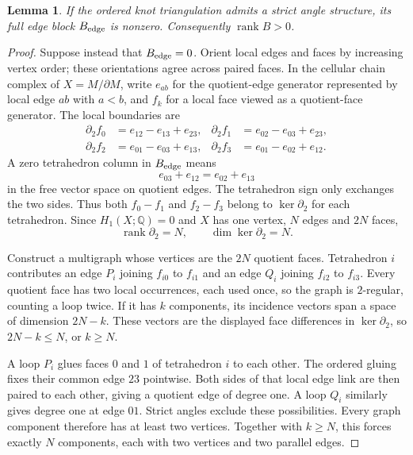 \documentclass[11pt]{article}
\newtheorem{lemma}[theorem]{Lemma}
\theoremstyle{definition}\newtheorem{definition}[theorem]{Definition}
\theoremstyle{remark}\newtheorem{remark}[theorem]{Remark}
\DeclareMathOperator{\rank}{rank}
\newcommand{\Q}{\mathbb Q}
\begin{document}
\begin{lemma}\label{lem:nozero}
If the ordered knot triangulation admits a strict angle structure,
its full edge block $B_{\rm edge}$ is nonzero. Consequently
$\rank B>0$.
\end{lemma}
\begin{proof}
Suppose instead that $B_{\rm edge}=0$. Orient local edges and faces
by increasing vertex order; these orientations agree across paired
faces. In the cellular chain complex of $X=M/\partial M$, write
$e_{ab}$ for the quotient-edge generator represented by local edge
$ab$ with $a<b$, and $f_k$ for a local face viewed as a quotient-face
generator. The local boundaries are
\[
\begin{aligned}
\partial_2 f_0&=e_{12}-e_{13}+e_{23},&
\partial_2 f_1&=e_{02}-e_{03}+e_{23},\\
\partial_2 f_2&=e_{01}-e_{03}+e_{13},&
\partial_2 f_3&=e_{01}-e_{02}+e_{12}.
\end{aligned}
\]
A zero tetrahedron column in $B_{\rm edge}$ means
\begin{equation}
e_{03}+e_{12}=e_{02}+e_{13}
\label{eq:zerocolumn}
\end{equation}
in the free vector space on quotient edges. The tetrahedron sign
only exchanges the two sides. Thus both $f_0-f_1$ and $f_2-f_3$
belong to $\ker\partial_2$ for each tetrahedron. Since
$H_1(X;\Q)=0$ and $X$ has one vertex, $N$ edges and $2N$ faces,
\[
\rank\partial_2=N,\qquad\dim\ker\partial_2=N.
\]

Construct a multigraph whose vertices are the $2N$ quotient faces.
Tetrahedron $i$ contributes an edge $P_i$ joining $f_{i0}$ to
$f_{i1}$ and an edge $Q_i$ joining $f_{i2}$ to $f_{i3}$. Every
quotient face has two local occurrences, each used once, so the
graph is $2$-regular, counting a loop twice. If it has $k$
components, its incidence vectors span a space of dimension $2N-k$.
These vectors are the displayed face differences in $\ker\partial_2$,
so $2N-k\leq N$, or $k\geq N$.

A loop $P_i$ glues faces $0$ and $1$ of tetrahedron $i$ to each
other. The ordered gluing fixes their common edge $23$ pointwise.
Both sides of that local edge link are then paired to each other,
giving a quotient edge of degree one. A loop $Q_i$ similarly gives
degree one at edge $01$. Strict angles exclude these possibilities.
Every graph component therefore has at least two vertices. Together
with $k\geq N$, this forces exactly $N$ components, each with two
vertices and two parallel edges.


\end{proof}
\end{document}

